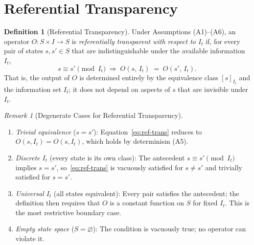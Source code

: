 \documentclass[12pt,openany]{book}
\newcommand{\calI}{\mathcal{I}}
\numberwithin{equation}{chapter}
\theoremstyle{plain}
\theoremstyle{definition}
\newtheorem{definition}[theorem]{Definition}
\theoremstyle{remark}
\newtheorem{remark}[theorem]{Remark}
\numberwithin{equation}{chapter}
\theoremstyle{plain}
\newcommand{\calS}{\mathcal{S}}
\def\calI{I}%
\def\calS{S}%
\begin{document}
\section{Referential Transparency}
\label{sec:ref-transparency}

\begin{definition}[Referential Transparency]
\label{def:ref-transparency}
Under Assumptions (A1)--(A6), an operator
$O : \calS \times \calI \to \calS$ is
\emph{referentially transparent with respect to $\calI_t$} if, for
every pair of states $s, s' \in \calS$ that are indistinguishable
under the available information $\calI_t$,
\begin{equation}
  s \equiv s' \pmod{\calI_t}
  \;\Longrightarrow\;
  O(s,\, \calI_t) \;=\; O(s',\, \calI_t).
  \label{eq:ref-trans}
\end{equation}
That is, the output of $O$ is determined entirely by the equivalence
class $[s]_{\calI_t}$ and the information set $\calI_t$; it does not
depend on aspects of $s$ that are invisible under $\calI_t$.
\end{definition}

\begin{remark}[Degenerate Cases for Referential Transparency]
\label{rem:rt-degenerate}
\begin{enumerate}
  \item \emph{Trivial equivalence} ($s = s'$):
        Equation~\eqref{eq:ref-trans} reduces to
        $O(s, \calI_t) = O(s, \calI_t)$, which holds by determinism
        (A5).
  \item \emph{Discrete $\calI_t$} (every state is its own class):
        The antecedent $s \equiv s' \pmod{\calI_t}$ implies $s = s'$,
        so~\eqref{eq:ref-trans} is vacuously satisfied for $s \neq s'$
        and trivially satisfied for $s = s'$.
  \item \emph{Universal $\calI_t$} (all states equivalent):
        Every pair satisfies the antecedent; the definition then
        requires that $O$ is a constant function on $\calS$ for fixed
        $\calI_t$.  This is the most restrictive boundary case.
  \item \emph{Empty state space} ($\calS = \varnothing$):
        The condition is vacuously true; no operator can violate it.
\end{enumerate}
\end{remark}
\end{document}

